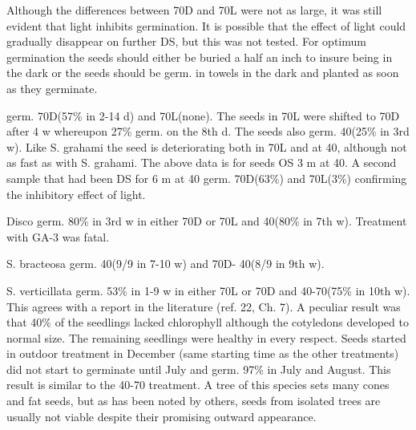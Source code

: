 \begin{description}
Although the differences between 70D and 70L were not as large, it was still evident
that light inhibits germination. It is possible that the effect of light could gradually
disappear on further DS, but this was not tested. For optimum germination the seeds
should either be buried a half an inch to insure being in the dark or the seeds should
be germ. in towels in the dark and planted as soon as they germinate.

\item[S. hooked] germ. 70D(57\% in 2-14 d) and 70L(none). The seeds in 70L were
shifted to 70D after 4 w whereupon 27\% germ. on the 8th d. The seeds also germ.
40(25\% in 3rd w). Like S. grahami the seed is deteriorating both in 70L and at 40,
although not as fast as with S. grahami. The above data is for seeds OS 3 m at 40. A
second sample that had been DS for 6 m at 40 germ. 70D(63\%) and 70L(3\%)
confirming the inhibitory effect of light.
\item[S. hybrids] Disco germ. 80\% in 3rd w in either 70D or 70L and 40(80\% in 7th w).
Treatment with GA-3 was fatal.

\item[Schoenolirion (Uliaceae)] S. bracteosa germ. 40(9/9 in 7-10 w) and 70D-
40(8/9 in 9th w).
\item[Sciadopitys (Pinaceae)] S. verticillata germ. 53\% in 1-9 w in either 70L or
70D and 40-70(75\% in 10th w). This agrees with a report in the literature (ref. 22, Ch.
7). A peculiar result was that 40\% of the seedlings lacked chlorophyll although the
cotyledons developed to normal size. The remaining seedlings were healthy in every
respect. Seeds started in outdoor treatment in December (same starting time as the
other treatments) did not start to germinate until July and germ. 97\% in July and
August. This result is similar to the 40-70 treatment. A tree of this species sets many
cones and fat seeds, but as has been noted by others, seeds from isolated trees are
usually not viable despite their promising outward appearance.


\end{description}
